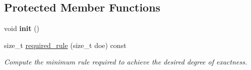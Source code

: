 \subsection*{Protected Member Functions}
\begin{DoxyCompactItemize}
\item 
\mbox{\label{classHArDCore3D_1_1QuadRuleTetra_aea9fa6144096012c2ea7f5b220493ef8}} 
void {\bfseries init} ()
\item 
size\+\_\+t \hyperlink{classHArDCore3D_1_1QuadRuleTetra_aaa2822c1275680abfc0ee93690b1a9b7}{required\+\_\+rule} (size\+\_\+t doe) const
\begin{DoxyCompactList}\small\item\em Compute the minimum rule required to achieve the desired degree of exactness. \end{DoxyCompactList}\end{DoxyCompactItemize}

